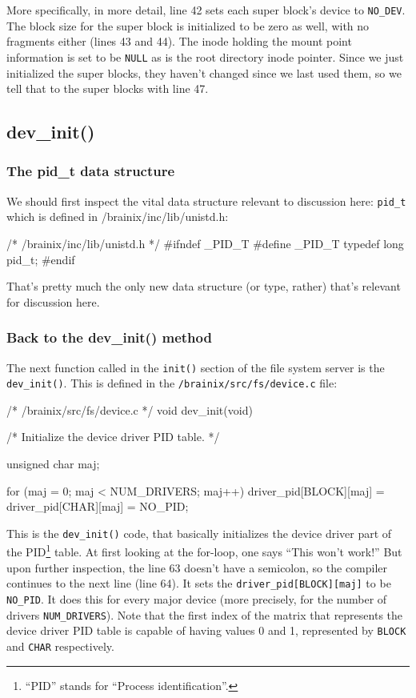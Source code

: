 More specifically, in more detail, line 42 sets each super block's device to \verb|NO_DEV|. The block size for the super block is initialized to be zero as well, with no fragments either (lines 43 and 44). The inode holding the mount point information is set to be \verb|NULL| as is the root directory inode pointer. Since we just initialized the super blocks, they haven't changed since we last used them, so we tell that to the super blocks with line 47.

\subsection{dev\_init()}

\subsubsection{The pid\_t data structure}

We should first inspect the vital data structure relevant to discussion here: \verb|pid_t| which is defined in /brainix/inc/lib/unistd.h:
\begin{code}[numbers=left,firstnumber=112]
/* /brainix/inc/lib/unistd.h */
 #ifndef _PID_T
 #define _PID_T
 typedef long pid_t;
 #endif
\end{code}
That's pretty much the only new data structure (or type, rather) that's relevant for discussion here.

\subsubsection{Back to the dev\_init() method}

The next function called in the \verb|init()| section of the file system server is the \verb|dev_init()|. This is defined in the \verb|/brainix/src/fs/device.c| file:
\begin{code}[numbers=left,firstnumber=55]
/* /brainix/src/fs/device.c */ 
 void dev_init(void)
 {
 
 /* Initialize the device driver PID table. */
 
      unsigned char maj;
 
      for (maj = 0; maj < NUM_DRIVERS; maj++) 
           driver_pid[BLOCK][maj] = 
           driver_pid[CHAR][maj] = NO_PID;
 }
\end{code}
This is the \verb|dev_init()| code, that basically initializes the device driver part of the PID\footnote{``PID'' stands for ``Process identification''.} table. At first looking at the for-loop, one says ``This won't work!'' But upon further inspection, the line 63 doesn't have a semicolon, so the compiler continues to the next line (line 64). It sets the \verb|driver_pid[BLOCK][maj]| to be \verb|NO_PID|. It does this for every major device (more precisely, for the number of drivers \verb|NUM_DRIVERS|). Note that the first index of the matrix that represents the device driver PID table is capable of having values 0 and 1, represented by \verb|BLOCK| and \verb|CHAR| respectively. 

